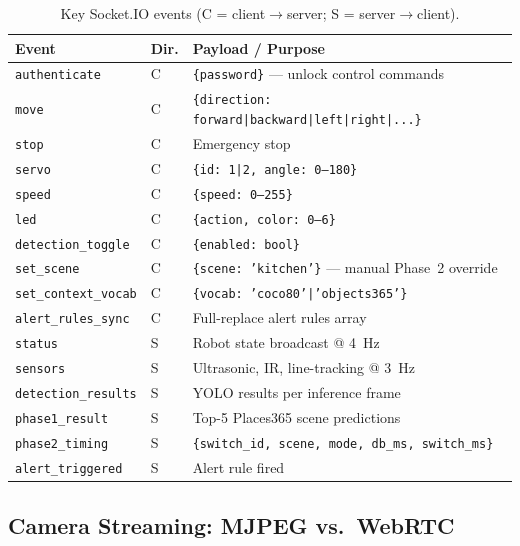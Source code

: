 \documentclass[12pt,a4paper]{article}
\begin{document}
\begin{table}[H]
\centering
\caption{Key Socket.IO events (C = client$\to$server; S = server$\to$client).}
\label{tab:socketio}
\small
\begin{tabularx}{\linewidth}{@{}llX@{}}
\toprule
\textbf{Event}         & \textbf{Dir.} & \textbf{Payload / Purpose} \\
\midrule
\texttt{authenticate}  & C & \texttt{\{password\}} — unlock control commands \\
\texttt{move}          & C & \texttt{\{direction: forward|backward|left|right|...\}} \\
\texttt{stop}          & C & Emergency stop \\
\texttt{servo}         & C & \texttt{\{id: 1|2, angle: 0--180\}} \\
\texttt{speed}         & C & \texttt{\{speed: 0--255\}} \\
\texttt{led}           & C & \texttt{\{action, color: 0--6\}} \\
\texttt{detection\_toggle}   & C & \texttt{\{enabled: bool\}} \\
\texttt{set\_scene}    & C & \texttt{\{scene: 'kitchen'\}} — manual Phase~2 override \\
\texttt{set\_context\_vocab} & C & \texttt{\{vocab: 'coco80'|'objects365'\}} \\
\texttt{alert\_rules\_sync}  & C & Full-replace alert rules array \\
\midrule
\texttt{status}        & S & Robot state broadcast @ 4~Hz \\
\texttt{sensors}       & S & Ultrasonic, IR, line-tracking @ 3~Hz \\
\texttt{detection\_results} & S & YOLO results per inference frame \\
\texttt{phase1\_result}     & S & Top-5 Places365 scene predictions \\
\texttt{phase2\_timing}     & S & \texttt{\{switch\_id, scene, mode, db\_ms, switch\_ms\}} \\
\texttt{alert\_triggered}   & S & Alert rule fired \\
\bottomrule
\end{tabularx}
\end{table}

\subsection{Camera Streaming: MJPEG vs.\ WebRTC}
\end{document}
